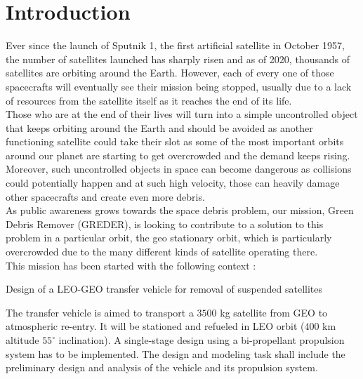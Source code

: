 \chapter*{Introduction}
\qquad Ever since the launch of Sputnik 1, the first artificial satellite in October 1957, the number of satellites launched has sharply risen and as of 2020, thousands of satellites are orbiting around the Earth. However, each of every one of those spacecrafts will eventually see their mission being stopped, usually due to a lack of resources from the satellite itself as it reaches the end of its life. \\

Those who are at the end of their lives will turn into a simple uncontrolled object that keeps orbiting around the Earth and should be avoided as another functioning satellite could take their slot as some of the most important orbits around our planet are starting to get overcrowded and the demand keeps rising.\\

Moreover, such uncontrolled objects in space can become dangerous as collisions could potentially happen and at such high velocity, those can heavily damage other spacecrafts and create even more debris.\\

As public awareness grows towards the space debris problem, our mission, Green Debris Remover (GREDER), is looking to contribute to a solution to this problem in a particular orbit, the geo stationary orbit, which is particularly overcrowded due to the many different kinds of satellite operating there. \\

This mission has been started with the following context :\\
\begin{center}
	Design of a LEO-GEO transfer vehicle for removal of suspended satellites
\end{center}
The transfer vehicle is aimed to transport a $3500$ kg satellite from GEO to atmospheric re-entry. It  will  be  stationed and  refueled in  LEO orbit ($400$ km altitude $55^\circ$ inclination). A single-stage design using  a  bi-propellant  propulsion  system has  to  be implemented. The  design  and modeling  task  shall include the  preliminary  design  and  analysis  of  the vehicle and  its propulsion system.